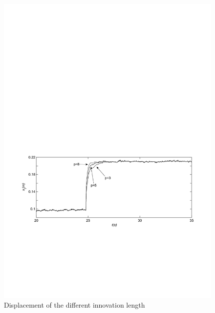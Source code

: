 \begin{figure}[!htb]
  \centering
  \includegraphics[width=\hsize]{MATLAB-innolength0.pdf}
  \caption{Displacement of the different innovation length}
  \label{fig:innolength0}
\end{figure}

